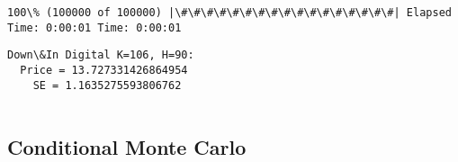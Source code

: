 \documentclass[11pt]{article}
\begin{document}
    \begin{Verbatim}[commandchars=\\\{\}]
100\% (100000 of 100000) |\#\#\#\#\#\#\#\#\#\#\#\#\#\#\#\#\#| Elapsed Time: 0:00:01 Time: 0:00:01

    \end{Verbatim}

    \begin{Verbatim}[commandchars=\\\{\}]
Down\&In Digital K=106, H=90:
  Price = 13.727331426864954
    SE = 1.1635275593806762


    \end{Verbatim}

    \subsection{Conditional Monte Carlo}\label{conditional-monte-carlo}
\end{document}
